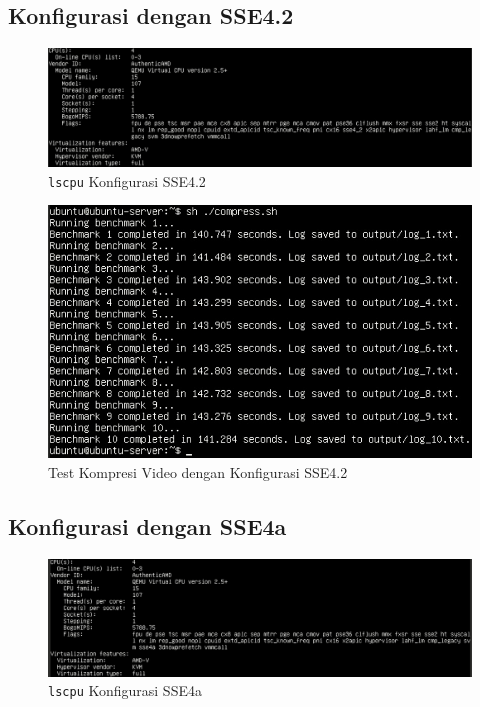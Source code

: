 \subsection{Konfigurasi dengan SSE4.2}
\begin{figure}
    \centering
    \includegraphics[width=1\textwidth]
    {assets/pics/video-compression-test/lscpu_sse4.2.jpeg}
    \caption{\texttt{lscpu} Konfigurasi SSE4.2}
    \label{fig:lscpu_video_compression_test_sse4.2}
\end{figure}

\begin{figure}
    \centering
    \includegraphics[width=1\textwidth]
    {assets/pics/video-compression-test/sse4.2.jpeg}
    \caption{Test Kompresi Video dengan Konfigurasi SSE4.2}
    \label{fig:video_compression_test_sse4.2}
\end{figure}

\subsection{Konfigurasi dengan SSE4a}
\begin{figure}
    \centering
    \includegraphics[width=1\textwidth]
    {assets/pics/video-compression-test/lscpu_sse4a.jpeg}
    \caption{\texttt{lscpu} Konfigurasi SSE4a}
    \label{fig:lscpu_video_compression_test_sse4a}
\end{figure}

